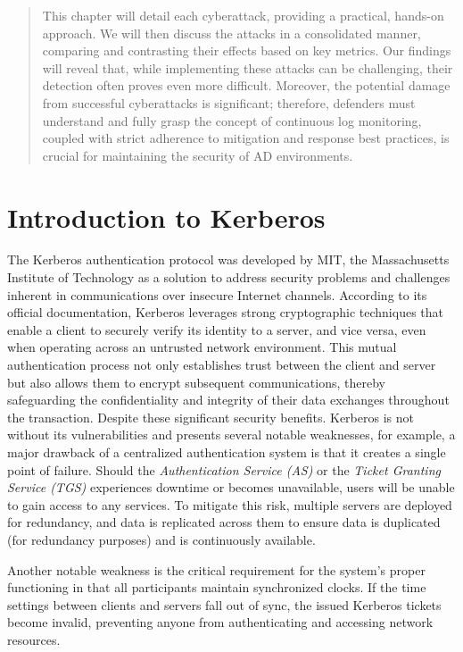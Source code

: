 \begin{abstract}
This chapter will detail each cyberattack, providing a practical, hands-on approach. We will then discuss the attacks in a consolidated manner, comparing and contrasting their effects based on key metrics. Our findings will reveal that, while implementing these attacks can be challenging, their detection often proves even more difficult. Moreover, the potential damage from successful cyberattacks is significant; therefore, defenders must understand and fully grasp the concept of continuous log monitoring, coupled with strict adherence to mitigation and response best practices, is crucial for maintaining the security of AD environments.
\end{abstract}

\section{Introduction to Kerberos}
The Kerberos authentication protocol was developed by MIT, the Massachusetts Institute of Technology as a solution to address security problems and challenges inherent in communications over insecure Internet channels. According to its official documentation, Kerberos leverages strong cryptographic techniques that enable a client to securely verify its identity to a server, and vice versa, even when operating across an untrusted network environment. This mutual authentication process not only establishes trust between the client and server but also allows them to encrypt subsequent communications, thereby safeguarding the confidentiality and integrity of their data exchanges throughout the transaction. Despite these significant security benefits. Kerberos is not without its vulnerabilities and presents several notable weaknesses, for example, a major drawback of a centralized authentication system is that it creates a single point of failure. Should the \textit{Authentication Service (AS)} or the \textit{Ticket Granting Service (TGS)} experiences downtime or becomes unavailable, users will be unable to gain access to any services. To mitigate this risk, multiple servers are deployed for redundancy, and data is replicated across them to ensure data is duplicated (for redundancy purposes) and is continuously available.

Another notable weakness is the critical requirement for the system's proper functioning in that all participants maintain synchronized clocks. If the time settings between clients and servers fall out of sync, the issued Kerberos tickets become invalid, preventing anyone from authenticating and accessing network resources.

